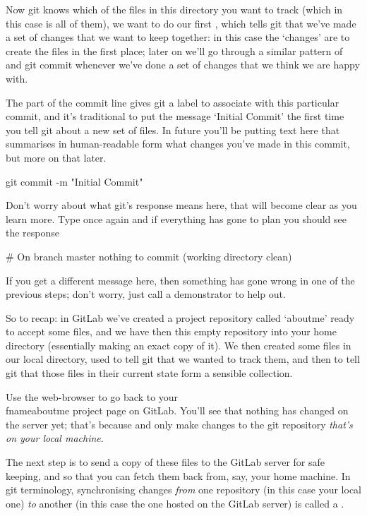 Now git knows which of the files in this directory you want to track (which in this case is all of them), we want to do our first , which tells git that we've made a set of changes that we want to keep together: in this case the `changes' are to create the files in the first place; later on we'll go through a similar pattern of  and {git commit} whenever we've done a set of changes that we think we are happy with. 

The  part of the commit line gives git a label to associate with this particular commit, and it's traditional to put the message `Initial Commit' the first time you tell git about a new set of files. In future you'll be putting text here that summarises in human-readable form what changes you've made in this commit, but more on that later.

\begin{ttoutenv}
git commit -m "Initial Commit"
\end{ttoutenv}

Don't worry about what git's response means here, that will become clear as you learn more. Type  once again and if everything has gone to plan you should see the response

\begin{ttoutenv}
# On branch master
nothing to commit (working directory clean)
\end{ttoutenv}

If you get a different message here, then something has gone wrong in one of the previous steps; don't worry, just call a demonstrator to help out. 

So to recap: in GitLab we've created a project repository called `aboutme' ready to accept some files, and we have then  this empty repository into your home directory (essentially making an exact copy of it). We then created some files in our local directory, used  to tell git that we wanted to track them, and then  to tell git that those files in their current state form a sensible collection. 

Use the web-browser to go back to your \\fname{aboutme} project page on GitLab. You'll see that nothing has changed on the server yet; that's because  and  only make changes to the git repository \emph{that's on your local machine}.

The next step is to send a copy of these files to the GitLab server for safe keeping, and so that you can fetch them back from, say, your home machine. In git terminology, synchronising changes \emph{from} one repository (in this case your local one) \emph{to} another (in this case the one hosted on the GitLab server) is called a . 

